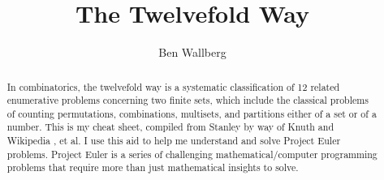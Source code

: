 \documentclass[]{article}
\begin{document}
\title{The Twelvefold Way}
\author{Ben Wallberg}
\maketitle

\begin{abstract}
In combinatorics, the twelvefold way is a systematic classification of 12 related enumerative problems concerning two finite sets, which include the classical problems of counting permutations, combinations, multisets, and partitions either of a set or of a number. This is my cheat sheet, compiled from Stanley \cite{stanley_enumerative_1997} by way of Knuth \cite{knuth_art_2011} and Wikipedia \cite{noauthor_twelvefold_nodate}, et al. I use this aid to help me understand and solve Project Euler \cite{noauthor_project_nodate} problems.  Project Euler is a series of challenging mathematical/computer programming problems that require more than just mathematical insights to solve. 
\end{abstract}
\end{document}
